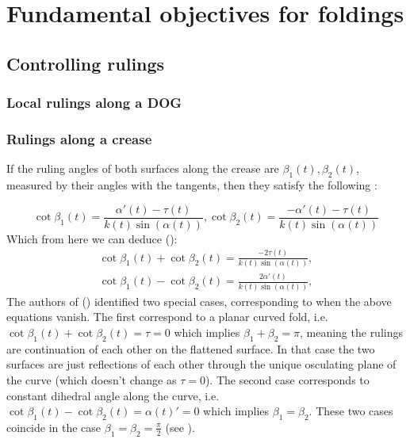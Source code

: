 \section{Fundamental objectives for foldings} \label{sec:objectives}

\subsection{Controlling rulings} \label{sec:rulings}

\subsubsection{Local rulings along a DOG} \label{sec:dog_rulings}
\subsubsection{Rulings along a crease} \label{sec:rulings_crease}
If the ruling angles of both surfaces along the crease are $\beta_1(t),\beta_2(t)$, measured by their angles with the tangents, then they satisfy the following \cite{more_on_paper,duncan_folded}:

\begin{equation}
\cot\beta_1(t) = \frac{\alpha'(t)-\tau(t)}{k(t)\sin(\alpha(t))},\cot\beta_2(t) = \frac{-\alpha'(t)-\tau(t)}{k(t)\sin(\alpha(t))}
\end{equation}
Which from here we can deduce (\cite{mathematical_omnibus,duncan_folded}):
\begin{equation} \label{cot_eq}
\begin{split}
\cot\beta_1(t) + \cot\beta_2(t) = \frac{-2\tau(t)}{k(t)\sin(\alpha(t))},\\
\cot\beta_1(t) - \cot\beta_2(t) = \frac{2\alpha'(t)}{k(t)\sin(\alpha(t))},
\end{split}	
\end{equation}
The authors of (\cite{mathematical_omnibus,duncan_folded}) identified two special cases, corresponding to when the above equations vanish. The first correspond to a planar curved fold, i.e. $\cot\beta_1(t) + \cot\beta_2(t) = \tau = 0$ which implies $\beta_1+\beta_2 = \pi$, meaning the rulings are continuation of each other on the flattened surface. In that case the two surfaces are just reflections of each other through the unique osculating plane of the curve (which doesn't change as $\tau = 0$). The second case corresponds to constant dihedral angle along the curve, i.e. $\cot\beta_1(t) - \cot\beta_2(t) = \alpha(t)' = 0$ which implies $\beta_1 = \beta_2$. These two cases coincide in the case $\beta_1 = \beta_2 = \frac{\pi}{2}$ (see ).


